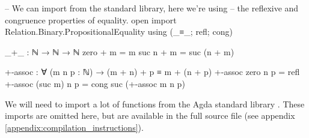 \documentclass[logo,bsc,singlespacing,parskip,online]{infthesis}
\renewenvironment{code}{\mintedcopy[breaklines,breaksymbolleft=\;]{agda}}{\endmintedcopy}
\begin{document}
\begin{code}
  -- We can import from the standard library, here we're using
  -- the reflexive and congruence properties of equality.
  open import Relation.Binary.PropositionalEquality
    using (_≡_; refl; cong)

  _+_ : ℕ → ℕ → ℕ
  zero  + m = m
  suc n + m = suc (n + m)

  +-assoc : ∀ (m n p : ℕ) → (m + n) + p ≡ m + (n + p)
  +-assoc zero    n p = refl
  +-assoc (suc m) n p = cong suc (+-assoc m n p)
\end{code}

We will need to import a lot of functions from the Agda standard library
\citep{the_agda_community_agda_2024}. These imports are omitted here, but are available in the full
source file (see appendix \ref{appendix:compilation_instructions}).
\begin{comment}
\begin{code}
-- Data types (naturals, strings, characters)
open import Data.Nat using (ℕ; zero; suc; _<_; _≥_; _≤_; _≤?_; _<?_; z≤n; s≤s; _⊔_)
  renaming (_≟_ to _≟ℕ_)
open import Data.Nat.Properties using (≤-refl; ≤-trans; ≤-<-trans; <-≤-trans; ≤-antisym; ≤-total;
  +-mono-≤; n≤1+n; m≤n⇒m≤1+n; suc-injective; <⇒≢; ≰⇒>; ≮⇒≥)
open import Data.String using (String; fromList) renaming (_≟_ to _≟str_; _++_ to _++str_;
  length to str-length; toList to ⟪_⟫)
open import Data.Char using (Char)
open import Data.Char.Properties using () renaming (_≟_ to _≟char_)

-- Function manipulation.
open import Function using (_∘_; flip; it; id; case_returning_of_)

-- Relations and predicates/decidability.
import Relation.Binary.PropositionalEquality as Eq
open Eq using (_≡_; _≢_; refl; sym; trans; cong; cong-app; cong₂)
open Eq.≡-Reasoning using (begin_; step-≡-∣; step-≡-⟩; _∎)
open import Relation.Binary.Definitions using (DecidableEquality)
open import Relation.Nullary.Decidable using (Dec; yes; no; True; False; toWitnessFalse;
  toWitness; fromWitness; ¬?; ⌊_⌋; From-yes)
open import Relation.Unary using (Decidable)
open import Relation.Binary using () renaming (Decidable to BinaryDecidable)
open import Relation.Nullary.Negation using (¬_; contradiction)
open import Data.Empty using (⊥-elim)

-- Products and exists quantifier.
open import Data.Product using (_×_; proj₁; proj₂; ∃-syntax) renaming (_,_ to ⟨_,_⟩)

-- Lists.
open import Data.List using (List; []; _∷_; _++_; length; filter; map; foldr; head; replicate)
open import Data.List.Properties using (≡-dec)
import Data.List.Membership.DecPropositional as DecPropMembership
open import Data.List.Relation.Unary.All using (All; all?; lookup)
  renaming (fromList to All-fromList; toList to All-toList)
open import Data.List.Relation.Unary.Any using (Any; here; there)
open import Data.List.Extrema Data.Nat.Properties.≤-totalOrder using (max; xs≤max)


\end{comment}
\end{document}
